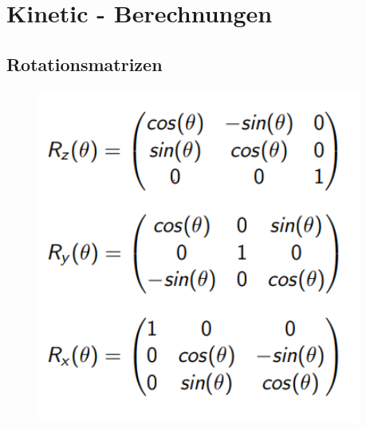 \section{Kinetic - Berechnungen}
\subsection{Rotationsmatrizen}
\begin{figure}[H]
	\begin{center}
		\includegraphics[scale=0.5]{resources/PNG/Rotationsmatrizen.PNG}
		\caption{}
		\label{fig:resources/PNG/Rotationsmatrizen.PNG}
	\end{center}
\end{figure}
